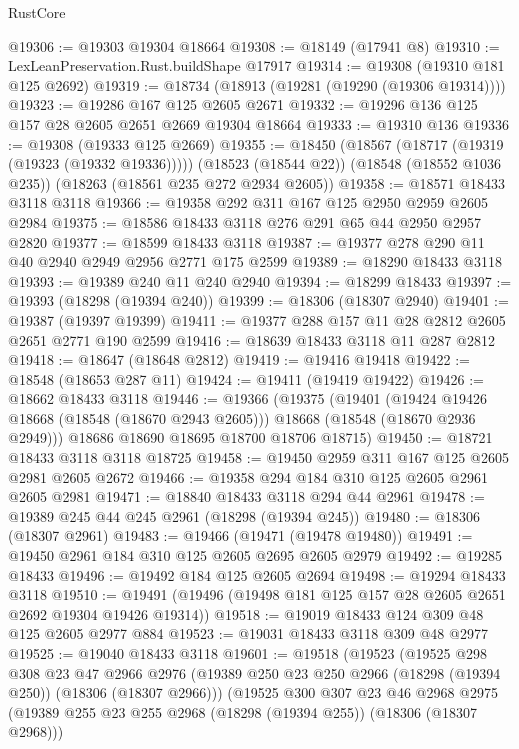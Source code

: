 \begin{lexlean}{RustCore}
\begin{coremodule}
@19306 := @19303 @19304 @18664
@19308 := @18149 (@17941 @8)
@19310 := LexLeanPreservation.Rust.buildShape @17917
@19314 := @19308 (@19310 @181 @125 @2692)
@19319 := @18734 (@18913 (@19281 (@19290 (@19306 @19314))))
@19323 := @19286 @167 @125 @2605 @2671
@19332 := @19296 @136 @125 @157 @28 @2605 @2651 @2669 @19304 @18664
@19333 := @19310 @136
@19336 := @19308 (@19333 @125 @2669)
@19355 := @18450
    (@18567 (@18717 (@19319 (@19323 (@19332 @19336)))))
    (@18523 (@18544 @22))
    (@18548 (@18552 @1036 @235))
    (@18263 (@18561 @235 @272 @2934 @2605))
@19358 := @18571 @18433 @3118 @3118
@19366 := @19358 @292 @311 @167 @125 @2950 @2959 @2605 @2984
@19375 := @18586 @18433 @3118 @276 @291 @65 @44 @2950 @2957 @2820
@19377 := @18599 @18433 @3118
@19387 := @19377 @278 @290 @11 @40 @2940 @2949 @2956 @2771 @175 @2599
@19389 := @18290 @18433 @3118
@19393 := @19389 @240 @11 @240 @2940
@19394 := @18299 @18433
@19397 := @19393 (@18298 (@19394 @240))
@19399 := @18306 (@18307 @2940)
@19401 := @19387 (@19397 @19399)
@19411 := @19377 @288 @157 @11 @28 @2812 @2605 @2651 @2771 @190 @2599
@19416 := @18639 @18433 @3118 @11 @287 @2812
@19418 := @18647 (@18648 @2812)
@19419 := @19416 @19418
@19422 := @18548 (@18653 @287 @11)
@19424 := @19411 (@19419 @19422)
@19426 := @18662 @18433 @3118
@19446 := @19366
    (@19375
      (@19401
        (@19424 @19426 @18668 (@18548 (@18670 @2943 @2605)))
        @18668
        (@18548 (@18670 @2936 @2949)))
      @18686
      @18690
      @18695
      @18700
      @18706
      @18715)
@19450 := @18721 @18433 @3118 @3118 @18725
@19458 := @19450 @2959 @311 @167 @125 @2605 @2981 @2605 @2672
@19466 := @19358 @294 @184 @310 @125 @2605 @2961 @2605 @2981
@19471 := @18840 @18433 @3118 @294 @44 @2961
@19478 := @19389 @245 @44 @245 @2961 (@18298 (@19394 @245))
@19480 := @18306 (@18307 @2961)
@19483 := @19466 (@19471 (@19478 @19480))
@19491 := @19450 @2961 @184 @310 @125 @2605 @2695 @2605 @2979
@19492 := @19285 @18433
@19496 := @19492 @184 @125 @2605 @2694
@19498 := @19294 @18433 @3118
@19510 := @19491 (@19496 (@19498 @181 @125 @157 @28 @2605 @2651 @2692 @19304 @19426 @19314))
@19518 := @19019 @18433 @124 @309 @48 @125 @2605 @2977 @884
@19523 := @19031 @18433 @3118 @309 @48 @2977
@19525 := @19040 @18433 @3118
@19601 := @19518
    (@19523
      (@19525
        @298
        @308
        @23
        @47
        @2966
        @2976
        (@19389 @250 @23 @250 @2966 (@18298 (@19394 @250)) (@18306 (@18307 @2966)))
        (@19525
          @300
          @307
          @23
          @46
          @2968
          @2975
          (@19389 @255 @23 @255 @2968 (@18298 (@19394 @255)) (@18306 (@18307 @2968)))

\end{coremodule}
\end{lexlean}
